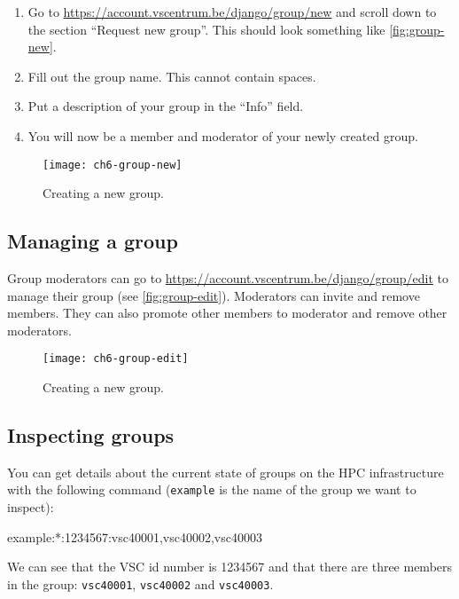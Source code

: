 \begin{enumerate}
    \item Go to \url{https://account.vscentrum.be/django/group/new} and scroll down
        to the section ``Request new group''. This should look something like
        \autoref{fig:group-new}.
    \item Fill out the group name. This cannot contain spaces.
    \item Put a description of your group in the ``Info'' field.
    \item You will now be a member and moderator of your newly created group.
\end{enumerate}

\begin{figure}[!htbp]
  \caption{Creating a new group.}
  \centering
    \texttt{[image: ch6-group-new]}
\end{figure}\label{fig:group-new}

\subsection{Managing a group}

Group moderators can go to \url{https://account.vscentrum.be/django/group/edit} to
manage their group (see \autoref{fig:group-edit}). Moderators can invite and remove members. They can also promote
other members to moderator and remove other moderators.

\begin{figure}[!htbp]
  \caption{Creating a new group.}
  \centering
    \texttt{[image: ch6-group-edit]}
\end{figure}\label{fig:group-edit}

\subsection{Inspecting groups}

You can get details about the current state of groups on the HPC infrastructure
with the following command (\lstinline|example| is the name of the group we want to inspect):

\begin{prompt}
example:*:1234567:vsc40001,vsc40002,vsc40003
\end{prompt}

We can see that the VSC id number is 1234567 and that there are three members in
the group: \lstinline|vsc40001|, \lstinline|vsc40002| and \lstinline|vsc40003|.

